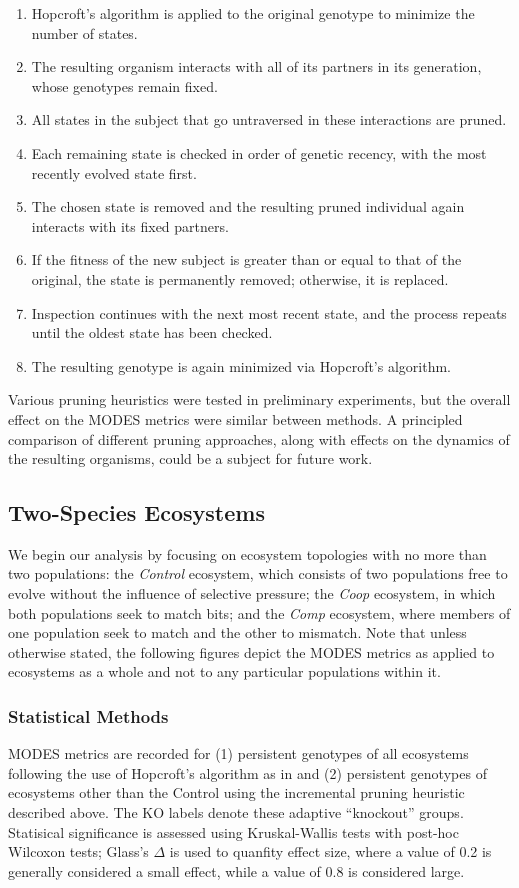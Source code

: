 \documentclass[letterpaper]{article}
\begin{document}
\begin{enumerate}
    \item Hopcroft's algorithm is applied to the original genotype to minimize the number of states.
    \item The resulting organism interacts with all of its partners in its generation, whose genotypes remain fixed. 
    \item All states in the subject that go untraversed in these interactions are pruned.
    \item Each remaining state is checked in order of genetic recency, with the most recently evolved state first. 
    \item The chosen state is removed and the resulting pruned individual again interacts with its fixed partners. 
    \item If the fitness of the new subject is greater than or equal to that of the original, the state is permanently removed; otherwise, it is replaced.
    \item Inspection continues with the next most recent state, and the process repeats until the oldest state has been checked.
    \item The resulting genotype is again minimized via Hopcroft's algorithm.
\end{enumerate}

Various pruning heuristics were tested in preliminary experiments, but the overall effect on the MODES metrics were similar between methods. A principled comparison of different pruning approaches, along with effects on the dynamics of the resulting organisms, could be a subject for future work.

\subsection{Two-Species Ecosystems}
We begin our analysis by focusing on ecosystem topologies with no more than two populations: the \textit{Control} ecosystem, which consists of two populations free to evolve without the influence of selective pressure; the \textit{Coop} ecosystem, in which both populations seek to match bits; and the \textit{Comp} ecosystem, where members of one population seek to match and the other to mismatch. Note that unless otherwise stated, the following figures depict the MODES metrics as applied to ecosystems as a whole and not to any particular populations within it.

\subsubsection{Statistical Methods}
MODES metrics are recorded for (1) persistent genotypes of all ecosystems following the use of Hopcroft's algorithm as in \cite{moran2019} and (2) persistent genotypes of ecosystems other than the Control using the incremental pruning heuristic described above. The KO labels denote these adaptive ``knockout'' groups. Statisical significance is assessed using Kruskal-Wallis tests with post-hoc Wilcoxon tests; Glass's $\Delta$ is used to quanfity effect size, where a value of 0.2 is generally considered a small effect, while a value of 0.8 is considered large.
\end{document}
